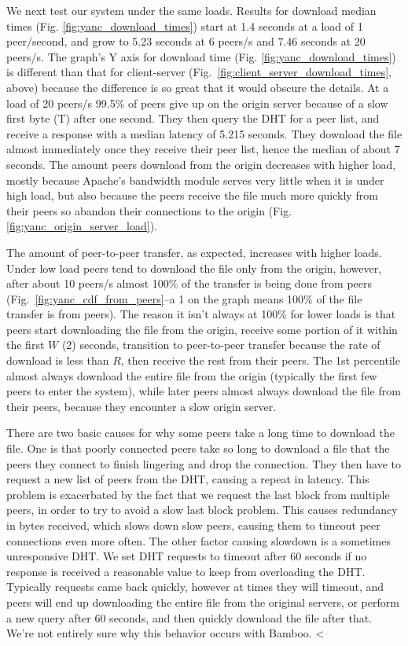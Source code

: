 We next test our system under the same loads. Results for download median times 
(Fig. \ref{fig:yanc_download_times}) start at 1.4 seconds at a load of 1 peer/second, and grow 
to 5.23 seconds at 6 peers/s and 7.46 seconds at 20 peers/s. The graph's Y axis for download time (Fig. \ref{fig:yanc_download_times}) 
is different than that for client-server (Fig.~\ref{fig:client_server_download_times}, above) 
because the difference is so great that it would obscure the details. At a load of 20 peers/s 99.5\% 
of peers give up on the origin server because of a slow first byte (T) after one second. They then query the 
DHT for a peer list, and receive a response with a median latency of 5.215 seconds.  They download the file almost 
immediately once they receive their peer list, hence the median of about 7 seconds. 
The amount peers download from the origin decreases with higher load, mostly because Apache's bandwidth module serves 
very little when it is under high load, but also because the peers receive the file much more quickly 
from their peers so abandon their connections to the origin (Fig. \ref{fig:yanc_origin_server_load}). 

The amount of peer-to-peer transfer, as expected, increases with higher loads. Under low load peers tend to download 
the file only from the origin, however, after about 10 peers/s almost 100\% of the transfer is being 
done from peers (Fig.~\ref{fig:yanc_cdf_from_peers}--a 1 on the graph means 100\% of the file 
transfer is from peers). The reason it isn't always at 100\% for lower loads is that peers start 
downloading the file from the origin, receive some portion of it within the first $W$ (2) seconds, 
transition to peer-to-peer transfer because the rate of download is less than $R$, then receive the rest from their peers. 
The 1st percentile almost always download the entire file from the origin 
(typically the first few peers to enter the system), while later peers almost always download the 
file from their peers, because they encounter a slow origin server. 

There are two basic causes for why some peers take a long time to download the file.  One is that poorly connected peers take so long to download a file 
that the peers they connect to finish lingering and drop the connection.  They then have to request a new 
list of peers from the DHT, causing a repeat in latency.  This problem is exacerbated by the fact that we request 
the last block from multiple peers, in order to try to avoid a slow last block problem.  This causes 
redundancy in bytes received, which slows down slow peers, causing them to timeout peer 
connections even more often. The other factor causing slowdown is a sometimes unresponsive DHT. We 
set DHT requests to timeout after 60 seconds if no response is received a reasonable value to keep from 
overloading the DHT. Typically requests came back quickly, however at times they will timeout, 
and peers will end up downloading the entire file from the original servers, or perform a new 
query after 60 seconds, and then quickly download the file after that.  We're not entirely sure why this behavior occurs with Bamboo.
<%


